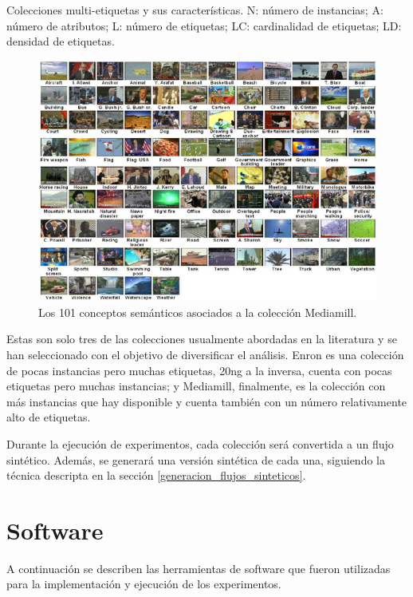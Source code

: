\begin{table}[htbp]
	\centering
	
	\caption[Colecciones multi-etiquetas y sus características.]{Colecciones multi-etiquetas y sus características. N: número de
		instancias; A: número de atributos; L: número de etiquetas; LC: cardinalidad
		de etiquetas; LD: densidad de etiquetas.}
	\label{tab:datasets}
\end{table}

\begin{figure}
	\includegraphics[width=.9\linewidth]{figures/mediamill.jpg}
	\centering
	\caption{Los 101 conceptos semánticos asociados a la colección
		Mediamill.}
	\label{fig:mediamill}
\end{figure}

Estas son solo tres de las colecciones usualmente abordadas en la literatura y
se han seleccionado con el objetivo de diversificar el análisis. Enron es una
colección de pocas instancias pero muchas etiquetas, 20ng a la inversa, cuenta
con pocas etiquetas pero muchas instancias; y Mediamill, finalmente, es la
colección con más instancias que hay disponible y cuenta también con un número
relativamente alto de etiquetas.

Durante la ejecución de experimentos, cada colección será convertida a un flujo
sintético. Además, se generará una versión sintética de cada una, siguiendo la
técnica descripta en la sección \ref{generacion_flujos_sinteticos}.

\section{Software}

A continuación se describen las herramientas de software que fueron utilizadas
para la implementación y ejecución de los experimentos.

